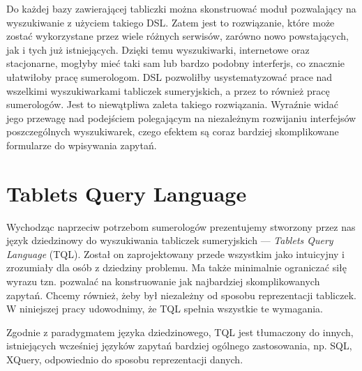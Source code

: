 Do każdej bazy zawierającej tabliczki można skonstruować moduł pozwalający na wyszukiwanie z użyciem takiego DSL.
Zatem jest to rozwiązanie, które może zostać wykorzystane przez wiele różnych serwisów, zarówno nowo powstających, jak i tych już istniejących. Dzięki temu wyszukiwarki, internetowe oraz stacjonarne, mogłyby mieć taki sam lub bardzo podobny interferjs, co znacznie ułatwiłoby pracę sumerologom. DSL pozwoliłby usystematyzować prace nad wszelkimi wyszukiwarkami tabliczek sumeryjskich, a przez to również pracę sumerologów. Jest to niewątpliwa zaleta takiego rozwiązania. Wyraźnie widać jego przewagę nad podejściem polegającym na niezależnym rozwijaniu interfejsów poszczególnych wyszukiwarek, czego efektem są coraz bardziej skomplikowane formularze do wpisywania zapytań.


\section*{Tablets Query Language}

Wychodząc naprzeciw potrzebom sumerologów prezentujemy stworzony przez nas język dziedzinowy do wyszukiwania tabliczek sumeryjskich --- \textit{Tablets Query Language} (TQL). Został on zaprojektowany przede wszystkim jako intuicyjny i zrozumiały dla osób z dziedziny problemu. Ma także minimalnie ograniczać siłę wyrazu tzn. pozwalać na konstruowanie jak najbardziej skomplikowanych zapytań. Chcemy również, żeby był niezależny od sposobu reprezentacji tabliczek. W niniejszej pracy udowodnimy, że TQL spełnia wszystkie te wymagania. 

Zgodnie z paradygmatem języka dziedzinowego, TQL jest tłumaczony do innych, istniejących wcześniej języków zapytań bardziej ogólnego zastosowania, np. SQL, XQuery, odpowiednio do sposobu reprezentacji danych.


